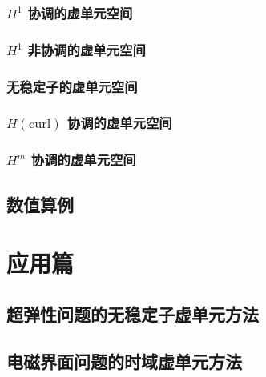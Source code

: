 \documentclass[aspectratio=169,serif]{beamer}
\begin{document}
\begin{frame}
  \frametitle{$H^1$ 协调的虚单元空间}
\end{frame}

\begin{frame}
  \frametitle{$H^1$ 非协调的虚单元空间}
\end{frame}

\begin{frame}
  \frametitle{无稳定子的虚单元空间}
\end{frame}

\begin{frame}
    \frametitle{$H(\mathrm{curl})$ 协调的虚单元空间}
\end{frame}

\begin{frame}
    \frametitle{$H^m$ 协调的虚单元空间}
\end{frame}

\subsection{数值算例}

\section{应用篇}

\subsection{超弹性问题的无稳定子虚单元方法}

\subsection{电磁界面问题的时域虚单元方法}
\end{document}
